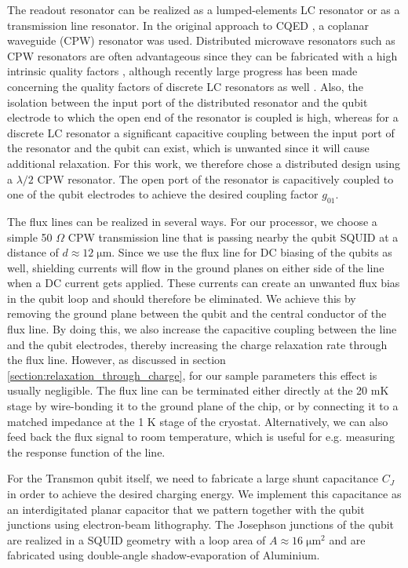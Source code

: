 The readout resonator can be realized as a lumped-elements LC resonator or as a transmission line resonator. In the original approach to CQED \citep{wallraff_strong_2004}, a coplanar waveguide (CPW) resonator was used. Distributed microwave resonators such as CPW resonators are often advantageous since they can be fabricated with a high intrinsic quality factors \citep{megrant_planar_2012,creedon_high_2011,wang_improving_2009,barends_minimal_2010}, although recently large progress has been made concerning the quality factors of discrete LC resonators as well \citep{khalil_loss_2011}. Also, the isolation between the input port of the distributed resonator and the qubit electrode to which the open end of the resonator is coupled is high, whereas for a discrete LC resonator a significant capacitive coupling between the input port of the resonator and the qubit can exist, which is unwanted since it will cause additional relaxation. For this work, we therefore chose a distributed design using a $\lambda/2$ CPW resonator. The open port of the resonator is capacitively coupled to one of the qubit electrodes to achieve the desired coupling factor $g_{01}$.

\smallskip

The flux lines can be realized in several ways. For our processor, we choose a simple 50 $\Omega$ CPW transmission line that is passing nearby the qubit SQUID at a distance of $d\approx 12\;\mathrm{\mu m}$. Since we use the flux line for DC biasing of the qubits as well, shielding currents will flow in the ground planes on either side of the line when a DC current gets applied. These currents can create an unwanted flux bias in the qubit loop and should therefore be eliminated. We achieve this by removing the ground plane between the qubit and the central conductor of the flux line. By doing this, we also increase the capacitive coupling between the line and the qubit electrodes, thereby increasing the charge relaxation rate through the flux line. However, as discussed in section \ref{section:relaxation_through_charge}, for our sample parameters this effect is usually negligible. The flux line can be terminated either directly at the 20 mK stage by wire-bonding it to the ground plane of the chip, or by connecting it to a matched impedance at the 1 K stage of the cryostat. Alternatively, we can also feed back the flux signal to room temperature, which is useful for e.g. measuring the response function of the line.

\smallskip

For the Transmon qubit itself, we need to fabricate a large shunt capacitance $C_J$ in order to achieve the desired charging energy. We implement this capacitance as an interdigitated planar capacitor that we pattern together with the qubit junctions using electron-beam lithography. The Josephson junctions of the qubit are realized in a SQUID geometry with a loop area of $A\approx 16\;\mathrm{\mu m}^2$ and are fabricated using double-angle shadow-evaporation of Aluminium.


